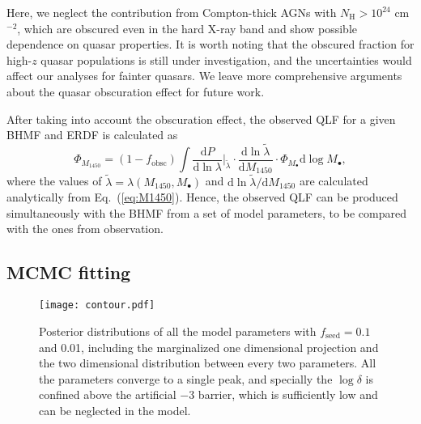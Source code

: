 \documentclass[twocolumn, twocolappendix]{aastex63}
\newcommand{\Mbh}{M_\bullet}
\newcommand{\fseed}{f_\mathrm{seed}}
\newcommand{\fobsc}{f_\mathrm{obsc}}
\newcommand{\Muv}{M_{1450}}
\newcommand{\D}{\mathrm{d}}
\newcommand{\red}[1]{\textcolor{red}{ #1}}
\begin{document}
\begin{CJK*}{UTF8}{gbsn}
Here, we neglect the contribution from Compton-thick AGNs with $N_\mathrm{H}>10^{24}$ cm$^{-2}$, 
which are obscured even in the hard X-ray band and show possible dependence on quasar properties.
It is worth noting that the obscured fraction for high-$z$ quasar populations is still under investigation,
and the uncertainties would affect our analyses for fainter quasars.
We leave more comprehensive arguments about the quasar obscuration effect for future work.

After taking into account the obscuration effect, 
the observed QLF for a given BHMF and ERDF is calculated as
\begin{equation}
\label{eq:dn_dM1450}
\Phi_{\Muv} 
 = (1 -\fobsc)  %
\int \frac{\D P}{\D \ln \lambda}\Big|_{\tilde{\lambda}}  \cdot
\frac{\D \ln \tilde{\lambda}}{\D \Muv} \cdot
 \Phi_{\Mbh} \D \log \Mbh,
\end{equation}
%
where the values of $\tilde{\lambda}=\lambda(\Muv, \Mbh)$ and $\D \ln \tilde{\lambda}/\D \Muv$ are calculated analytically from Eq.~(\ref{eq:M1450}).
%
Hence, the observed QLF can be produced simultaneously with the BHMF from a set of model parameters, 
to be compared with the ones from observation.




\vspace{2mm}
\subsection{MCMC fitting}\label{sec:fitting}

\begin{figure*}
\centering
\texttt{[image: contour.pdf]}
\caption{
Posterior distributions of all the model parameters with $\fseed=0.1$ and 0.01, 
including the marginalized one dimensional projection and the two dimensional distribution between every two parameters. 
All the parameters converge to a single peak, 
and specially the $\log\delta$ is confined above the artificial $-3$ barrier, 
which is sufficiently low and can be neglected in the model.
}
\label{fig:contour}
\vspace{5mm}
\end{figure*}
%



\end{CJK*}
\end{document}

